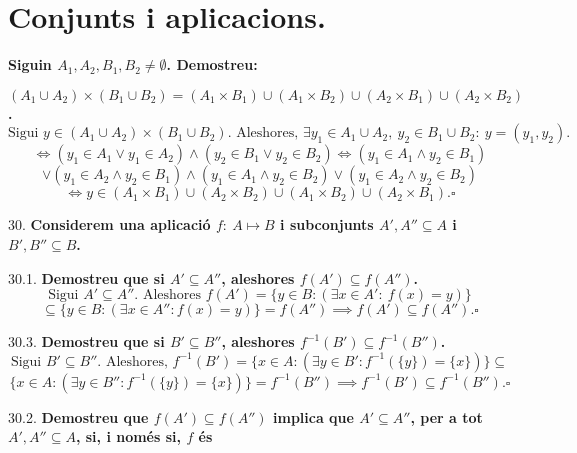 \documentclass[11pt]{article}
\begin{document}
\section{Conjunts i aplicacions.}
\begin{legal}[start=21]
	\item \textbf{Siguin $A_1,A_2,B_1,B_2\neq\emptyset$. Demostreu:}
	\begin{legal}[start=3]
		\item \textbf{$(A_1\cup A_2)\times (B_1\cup B_2)=(A_1\times B_1)\cup (A_1\times B_2)\cup (A_2\times B_1)\cup (A_2\times B_2)$.}
		$$\textrm{Sigui }y\in (A_1\cup A_2)\times (B_1\cup B_2).\textrm{ Aleshores, }\exists y_1\in A_1\cup A_2, \ y_2\in B_1\cup B_2: \ y=(y_1,y_2).$$
		$$\iff (y_1\in A_1 \vee y_1\in A_2)\wedge (y_2\in B_1 \vee y_2\in B_2)\iff (y_1\in A_1\wedge y_2\in B_1)$$
		$$\vee (y_1\in A_2 \wedge y_2\in B_1)\wedge (y_1\in A_1\wedge y_2\in B_2)\vee (y_1\in A_2\wedge y_2\in B_2)$$
		$$\iff y\in (A_1\times B_1)\cup (A_2\times B_2)\cup (A_1\times B_2)\cup (A_2\times B_1).\square$$
	\end{legal}
	\item[30.] \textbf{Considerem una aplicació $f: \ A\mapsto B$ i subconjunts $A',A''\subseteq A$ i $B',B''\subseteq B$.}
	\begin{legal}
		\item[30.1.] \textbf{Demostreu que si $A'\subseteq A''$, aleshores $f(A')\subseteq f(A'')$.}
		$$\textrm{Sigui }A'\subseteq A''.\textrm{ Aleshores }f(A')=\{y\in B:(\exists x\in A':\ f(x)=y)\}$$
		$$\subseteq \{y\in B:(\exists x\in A'':f(x)=y)\}=f(A'')\implies f(A')\subseteq f(A'').\square$$
		\item[30.3.] \textbf{Demostreu que si $B'\subseteq B''$, aleshores $f^{-1}(B')\subseteq f^{-1}(B'')$.}
		$$\textrm{Sigui }B'\subseteq B''.\textrm{ Aleshores, }f^{-1}(B')=\{x\in A:(\exists y\in B':f^{-1}(\{y\})=\{x\})\}\subseteq$$
		$$\{x\in A:(\exists y\in B'':f^{-1}(\{y\})=\{x\})\}=f^{-1}(B'')\implies f^{-1}(B')\subseteq f^{-1}(B'').\square$$		
		\item[30.2.] \textbf{Demostreu que $f(A')\subseteq f(A'')$ implica que $A'\subseteq A''$, per a tot $A',A''\subseteq A$, si, i només si, $f$ és
}
\end{legal}
\end{legal}
\end{document}
